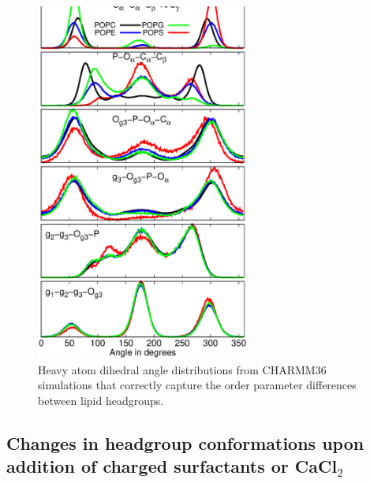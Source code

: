 \documentclass[journal=jpcbfk]{achemso}
\begin{document}
\begin{figure}[]
  \centering
  \includegraphics[width=7.0cm]{./Figs/DIHEDRALS.eps}
  \caption{\label{DIHdists}
    Heavy atom dihedral angle distributions from CHARMM36 simulations that correctly capture the order parameter differences between lipid headgroups.
  }
\end{figure}




\clearpage
\subsection{Changes in headgroup conformations upon addition of charged surfactants or CaCl$_2$}
\end{document}
